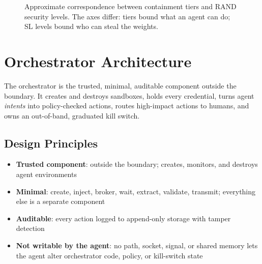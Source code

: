 \documentclass[11pt,letterpaper]{article}
\begin{document}
\begin{figure}[htbp]
\caption{Approximate correspondence between containment tiers and RAND security levels. The axes differ: tiers bound what an agent can do; SL levels bound who can steal the weights.}
\label{fig:slmap}
\end{figure}



\section{Orchestrator Architecture}
\label{sec:orch}

\begin{glance}
The orchestrator is the trusted, minimal, auditable component outside the boundary. It creates and destroys sandboxes, holds every credential, turns agent \emph{intents} into policy-checked actions, routes high-impact actions to humans, and owns an out-of-band, graduated kill switch.
\end{glance}

\subsection{Design Principles}

\begin{keybox}
\begin{itemize}
  \item \textbf{Trusted component}: outside the boundary; creates, monitors, and destroys agent environments
  \item \textbf{Minimal}: create, inject, broker, wait, extract, validate, transmit; everything else is a separate component
  \item \textbf{Auditable}: every action logged to append-only storage with tamper detection
  \item \textbf{Not writable by the agent}: no path, socket, signal, or shared memory lets the agent alter orchestrator code, policy, or kill-switch state
\end{itemize}
\end{keybox}
\end{document}
